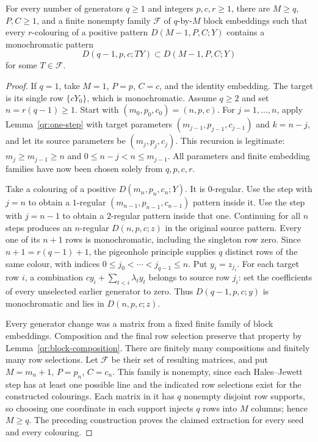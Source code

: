 \begin{theorem}
\label{qr:finite-deuber}
\leanok
{}
For every number of generators $q\geq1$ and integers $p,c,r\geq1$, there
are $M\geq q$, $P,C\geq1$, and a finite nonempty family
$\mathcal F$ of $q$-by-$M$ block embeddings such that every $r$-colouring
of a positive pattern $D(M-1,P,C;Y)$ contains a monochromatic pattern
\[
 D(q-1,p,c;TY)\subset D(M-1,P,C;Y)
\]
for some $T\in\mathcal F$.
\end{theorem}
\begin{proof}
If $q=1$, take $M=1$, $P=p$, $C=c$, and the identity embedding.
The target is its single row $\{cY_0\}$, which is monochromatic.
Assume $q\geq2$ and set $n=r(q-1)\geq1$.
Start with $(m_0,p_0,c_0)=(n,p,c)$.
For $j=1,\ldots,n$, apply Lemma~\ref{qr:one-step} with target parameters
$(m_{j-1},p_{j-1},c_{j-1})$ and $k=n-j$, and let its source parameters
be $(m_j,p_j,c_j)$.  This recursion is legitimate: $m_j\geq m_{j-1}\geq n$
and $0\leq n-j<n\leq m_{j-1}$.
All parameters and finite embedding families have now been chosen solely
from $q,p,c,r$.

Take a colouring of a positive $D(m_n,p_n,c_n;Y)$.
It is $0$-regular.  Use the step with $j=n$ to obtain a $1$-regular
$(m_{n-1},p_{n-1},c_{n-1})$ pattern inside it.
Use the step with $j=n-1$ to obtain a $2$-regular pattern inside that one.
Continuing for all $n$ steps produces an $n$-regular
$D(n,p,c;z)$ in the original source pattern.
Every one of its $n+1$ rows is monochromatic, including the singleton
row zero.  Since $n+1=r(q-1)+1$, the pigeonhole principle supplies $q$
distinct rows of the same colour, with indices
$0\leq j_0<\cdots<j_{q-1}\leq n$.
Put $y_i=z_{j_i}$.  For each target row $i$, a combination
$cy_i+\sum_{t<i}\lambda_t y_t$ belongs to source row $j_i$: set the
coefficients of every unselected earlier generator to zero.
Thus $D(q-1,p,c;y)$ is monochromatic and lies in $D(n,p,c;z)$.

Every generator change was a matrix from a fixed finite family of block
embeddings.  Composition and the final row selection preserve that property
by Lemma~\ref{qr:block-composition}.
There are finitely many compositions and finitely many row selections.
Let $\mathcal F$ be their set of resulting matrices, and put
$M=m_n+1$, $P=p_n$, $C=c_n$.
This family is nonempty, since each Hales--Jewett step has at least one
possible line and the indicated row selections exist for the constructed
colourings.  Each matrix in it has $q$ nonempty disjoint row supports, so
choosing one coordinate in each support injects $q$ rows into $M$ columns;
hence $M\geq q$.
The preceding construction proves the claimed extraction for every seed
and every colouring.
\end{proof}

